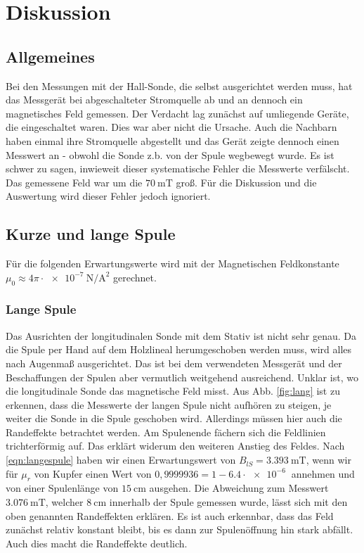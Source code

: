\section{Diskussion}
\label{sec:Diskussion}
\subsection{Allgemeines}
Bei den Messungen mit der Hall-Sonde, die selbst ausgerichtet werden muss, hat das Messgerät bei abgeschalteter Stromquelle ab und an dennoch ein magnetisches Feld gemessen.
Der Verdacht lag zunächst auf umliegende Geräte, die eingeschaltet waren. Dies war aber nicht die Ursache.
Auch die Nachbarn haben einmal ihre Stromquelle abgestellt und das Gerät zeigte dennoch einen Messwert an - obwohl die Sonde z.b. von der Spule wegbewegt wurde.
Es ist schwer zu sagen, inwieweit dieser systematische Fehler die Messwerte verfälscht. Das gemessene Feld war um die $\SI{70}{\milli\tesla}$ groß.
Für die Diskussion und die Auswertung wird dieser Fehler jedoch ignoriert.

\subsection{Kurze und lange Spule}
Für die folgenden Erwartungswerte wird mit der Magnetischen Feldkonstante \\
$\mu_0 \approx 4\pi\cdot\SI{e-7}{\newton\per\square\ampere}$ gerechnet.\cite{taschenbuch}
\subsubsection{Lange Spule}
Das Ausrichten der longitudinalen Sonde mit dem Stativ ist nicht sehr genau. Da die Spule per Hand auf dem Holzlineal herumgeschoben werden muss, 
wird alles nach Augenmaß ausgerichtet. Das ist bei dem verwendeten Messgerät und der Beschaffungen der Spulen aber vermutlich weitgehend ausreichend.
Unklar ist, wo die longitudinale Sonde das magnetische Feld misst. Aus Abb. \ref{fig:lang} ist zu erkennen, dass die Messwerte der langen Spule nicht aufhören zu steigen, je weiter 
die Sonde in die Spule geschoben wird. Allerdings müssen hier auch die Randeffekte betrachtet werden. Am Spulenende fächern sich die Feldlinien trichterförmig auf.
Das erklärt widerum den weiteren Anstieg des Feldes.
Nach \ref{eqn:langespule} haben wir einen Erwartungswert von $B_{lS} = \SI{3.393}{\milli\tesla}$, wenn wir für $\mu_r$ von Kupfer einen Wert von $0,9999936 = 1 − 6.4\cdot \SI{e-6}{}$ annehmen\cite{taschenbuch}
und von einer Spulenlänge von $\SI{15}{\centi\m}$ ausgehen.
Die Abweichung zum Messwert $\SI{3.076}{\milli\tesla}$, welcher $\SI{8}{\centi\m}$ innerhalb der Spule gemessen wurde, lässt sich mit den oben genannten Randeffekten erklären.
Es ist auch erkennbar, dass das Feld zunächst relativ konstant bleibt, bis es dann zur Spulenöffnung hin stark abfällt. Auch dies macht die Randeffekte deutlich.
